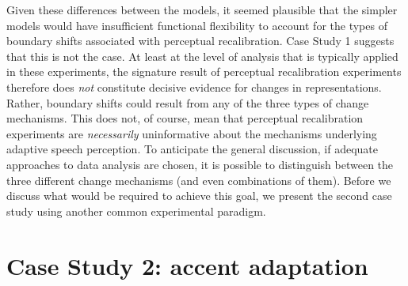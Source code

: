 \documentclass[
  11pt,
  english,
  man,floatsintext]{apa6}
\begin{document}
Given these differences between the models, it seemed plausible that the simpler models would have insufficient functional flexibility to account for the types of boundary shifts associated with perceptual recalibration. Case Study 1 suggests that this is not the case. At least at the level of analysis that is typically applied in these experiments, the signature result of perceptual recalibration experiments therefore does \emph{not} constitute decisive evidence for changes in representations. Rather, boundary shifts could result from any of the three types of change mechanisms. This does not, of course, mean that perceptual recalibration experiments are \emph{necessarily} uninformative about the mechanisms underlying adaptive speech perception. To anticipate the general discussion, if adequate approaches to data analysis are chosen, it is possible to distinguish between the three different change mechanisms (and even combinations of them). Before we discuss what would be required to achieve this goal, we present the second case study using another common experimental paradigm.

\hypertarget{sec:AA}{%
\section{Case Study 2: accent adaptation}\label{sec:AA}}
\end{document}
